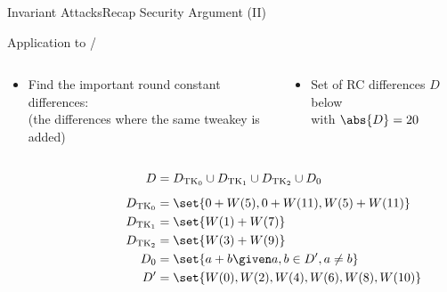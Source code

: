 \begin{frame}{Invariant Attacks}{Recap Security Argument (II)}
    \begin{block}{Application to \clyde/}
    \begin{columns}
        \begin{column}{0.55\textwidth}
        \begin{itemize}
            \item Find the important round constant differences:\\
                  {\small (the differences where the same tweakey is added)}
        \end{itemize}
        \end{column}
        \pause
            \begin{column}{0.45\textwidth}
            \begin{itemize}
                \item[] Set of RC differences $D$ below\\
                        with $\abs{D} = 20$
            \end{itemize}
            \end{column}
    \end{columns}
    \end{block}
    \pause
    \begin{columns}
        \begin{column}{0.45\textwidth}
        \end{column}
        \pause
        \begin{column}{0.45\textwidth}
            \vspace*{-10pt}
            \begin{align*}
                D &= D_{\mathrm{TK}_0} \cup D_{\mathrm{TK}_1} \cup D_{\mathrm{TK}_2} \cup D_0\\[5pt]
                D_{\mathrm{TK}_0} &= \set{0 + W(5), 0 + W(11), W(5) + W(11)} \\
                D_{\mathrm{TK}_1} &= \set{W(1) + W(7)} \\
                D_{\mathrm{TK}_2} &= \set{W(3) + W(9)} \\
                D_{0} &= \set{a + b \given a, b \in D^\prime, a \neq b} \\
                D^\prime &= \set{W(0), W(2), W(4), W(6), W(8), W(10)}
            \end{align*}
        \end{column}
    \end{columns}
\end{frame}

